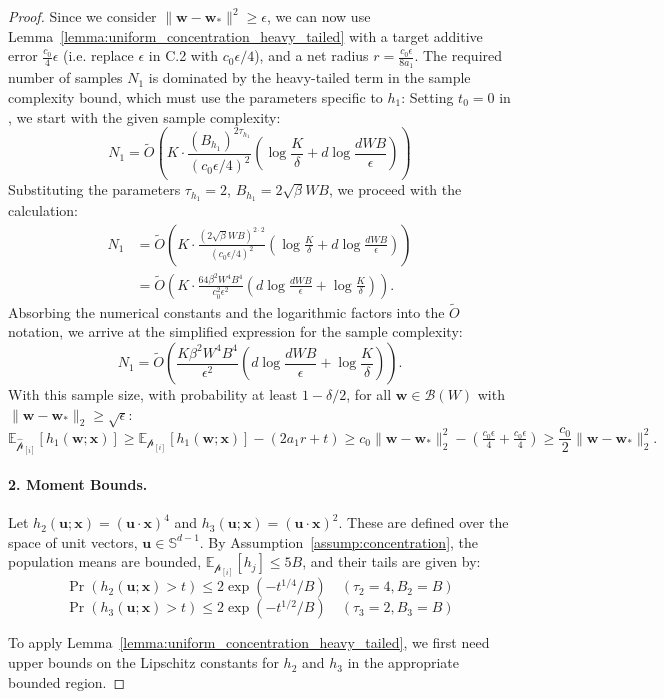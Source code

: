 \documentclass[11pt]{article}
\newcounter{thm}
\numberwithin{thm}{section}
\theoremstyle{plain}
\theoremstyle{definition}
\theoremstyle{remark} \newtheorem{remark}[thm]{Remark}
\def\eps{{\epsilon}}
\def\vu{{\bm{u}}}
\def\vw{{\bm{w}}}
\def\vx{{\bm{x}}}
\def\ep{\widehat{\mathcal{p}}}
\def\pp{{\mathcal{p}}}
\def\cB{{\mathcal{B}}}
\newcommand{\E}{\mathbb{E}}
\newcommand{\ppi}{{\pp_{[i]}}}
\newcommand{\epi}{\ep_{[i]}}
\begin{document}
\begin{proof}
Since we consider $\|\vw-\vw_*\|^2 \ge \eps$, we can now use Lemma~\ref{lemma:uniform_concentration_heavy_tailed} with a target additive error $\frac{c_0}{4}\eps$ (i.e. replace $\eps$ in C.2 with $c_0\eps/4$), and a net radius $r = \frac{c_0\eps}{8a_1}$. The required number of samples $N_1$ is dominated by the heavy-tailed term in the sample complexity bound, which must use the parameters specific to $h_1$:
Setting $t_0 = 0$ in , we start with the given sample complexity:
\[
N_1 = \tilde{O}\left( K \cdot \frac{ (B_{h_1})^{2\tau_{h_1}} 
}{(c_0 \eps/4)^2}
\left(\log\frac{K}{\delta} + d\log \frac{dWB}{\epsilon}\right)\right)
\]
Substituting the parameters $\tau_{h_1}=2$, $B_{h_1} = 2\sqrt{\beta} W B$, we proceed with the calculation:
\begin{align*}
    N_1 &= \tilde{O}\left( K \cdot \frac{(2\sqrt{\beta} W B)^{2 \cdot 2} 
    }{(c_0\eps/4)^2} \left(\log\frac{K}{\delta} + d\log \frac{dWB}{\epsilon}\right)\right) \\
    &= \tilde{O}\left( K \cdot \frac{64 \beta^2 W^4 B^4}{c_0^2\eps^2} 
    \left(d\log\frac{dWB}{\eps} + \log\frac{K}{\delta}\right)\right).
\end{align*}
Absorbing the numerical constants and the logarithmic factors into the $\tilde{O}$ notation, we arrive at the simplified expression for the sample complexity:
\[
N_1 = \tilde{O}\left( \frac{K \beta^2 W^4 B^4}{\eps^2} \left(d\log\frac{dWB}{\epsilon} + \log\frac{K}{\delta}\right) \right).
\]
With this sample size, with probability at least $1-\delta/2$, for all $\vw \in \cB(W)$ with $\|\vw-\vw_*\|_2 \ge \sqrt{\eps}$:
\[
\E_{\epi}[h_1(\vw;\vx)] \ge \E_{\ppi}[h_1(\vw;\vx)] - (2a_1r+t) \ge c_0\|\vw-\vw_*\|_2^2 - \left(\tfrac{c_0\eps}{4} + \tfrac{c_0\eps}{4}\right) \ge \frac{c_0}{2}\|\vw-\vw_*\|_2^2.
\]

\paragraph{2. Moment Bounds.}
Let $h_2(\vu;\vx) = (\vu\cdot\vx)^4$ and $h_3(\vu;\vx) = (\vu\cdot\vx)^2$. These are defined over the space of unit vectors, $\vu \in \mathbb{S}^{d-1}$. By Assumption~\ref{assump:concentration}, the population means are bounded, $\E_{\ppi}[h_j] \le 5B$, and their tails are given by:
\[ \Pr(h_2(\vu; \vx) > t) \leq 2\exp(-t^{1/4}/B) \quad (\tau_2=4, B_2=B) \]
\[ \Pr(h_3(\vu; \vx) > t) \leq 2\exp(-t^{1/2}/B) \quad (\tau_3=2, B_3=B) \]

To apply Lemma~\ref{lemma:uniform_concentration_heavy_tailed}, we first need upper bounds on the Lipschitz constants for $h_2$ and $h_3$ in the appropriate bounded region.


\end{proof}
\end{document}
